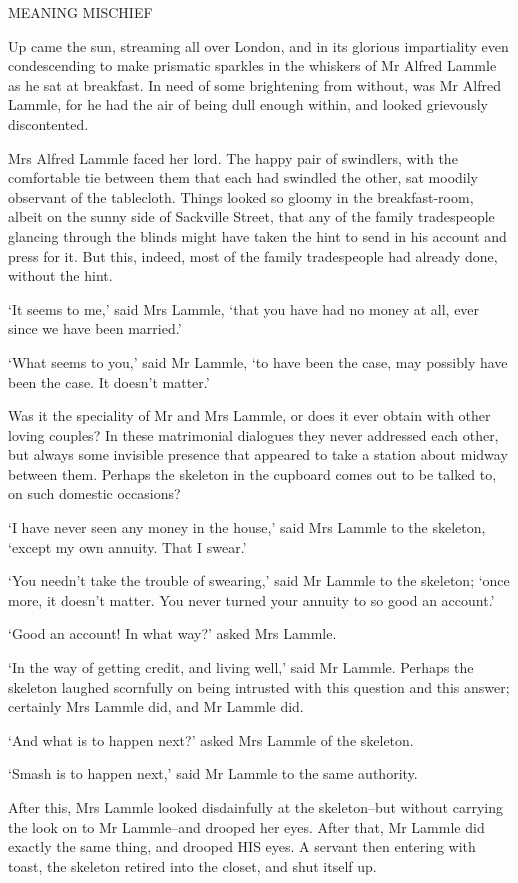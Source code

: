 MEANING MISCHIEF


Up came the sun, streaming all over London, and in its glorious
impartiality even condescending to make prismatic sparkles in the
whiskers of Mr Alfred Lammle as he sat at breakfast. In need of some
brightening from without, was Mr Alfred Lammle, for he had the air of
being dull enough within, and looked grievously discontented.

Mrs Alfred Lammle faced her lord. The happy pair of swindlers, with
the comfortable tie between them that each had swindled the other, sat
moodily observant of the tablecloth. Things looked so gloomy in the
breakfast-room, albeit on the sunny side of Sackville Street, that any
of the family tradespeople glancing through the blinds might have taken
the hint to send in his account and press for it. But this, indeed, most
of the family tradespeople had already done, without the hint.

‘It seems to me,’ said Mrs Lammle, ‘that you have had no money at all,
ever since we have been married.’

‘What seems to you,’ said Mr Lammle, ‘to have been the case, may
possibly have been the case. It doesn’t matter.’

Was it the speciality of Mr and Mrs Lammle, or does it ever obtain
with other loving couples? In these matrimonial dialogues they never
addressed each other, but always some invisible presence that appeared
to take a station about midway between them. Perhaps the skeleton in the
cupboard comes out to be talked to, on such domestic occasions?

‘I have never seen any money in the house,’ said Mrs Lammle to the
skeleton, ‘except my own annuity. That I swear.’

‘You needn’t take the trouble of swearing,’ said Mr Lammle to the
skeleton; ‘once more, it doesn’t matter. You never turned your annuity
to so good an account.’

‘Good an account! In what way?’ asked Mrs Lammle.

‘In the way of getting credit, and living well,’ said Mr Lammle. Perhaps
the skeleton laughed scornfully on being intrusted with this question
and this answer; certainly Mrs Lammle did, and Mr Lammle did.

‘And what is to happen next?’ asked Mrs Lammle of the skeleton.

‘Smash is to happen next,’ said Mr Lammle to the same authority.

After this, Mrs Lammle looked disdainfully at the skeleton--but without
carrying the look on to Mr Lammle--and drooped her eyes. After that, Mr
Lammle did exactly the same thing, and drooped HIS eyes. A servant then
entering with toast, the skeleton retired into the closet, and shut
itself up.

